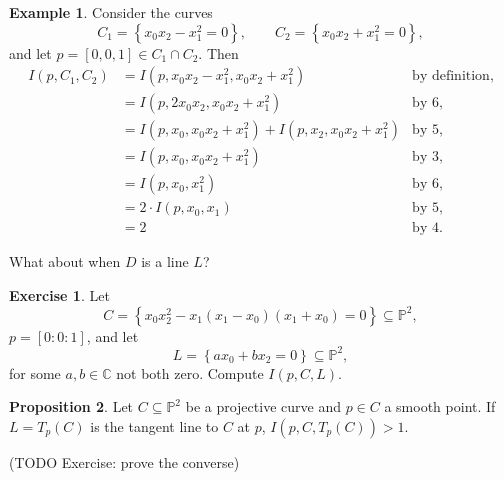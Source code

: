 \documentclass{article}
\newcommand{\C}{\mathbb{C}}
\renewcommand{\P}{\mathbb{P}}
\newcommand{\rb}[1]{\left( #1 \right)}
\renewcommand{\sb}[1]{\left[ #1 \right]}
\newcommand{\cb}[1]{\left\{ #1 \right\}}
\theoremstyle{definition}\newtheorem{definition}{Definition}[section]
\theoremstyle{definition}\newtheorem{notation}[definition]{Notation}
\theoremstyle{definition}\newtheorem{remark}[definition]{Remark}
\theoremstyle{definition}\newtheorem{example}[definition]{Example}
\theoremstyle{definition}\newtheorem{fact}{Fact}
\theoremstyle{definition}\newtheorem{exercise}{Exercise}
\newtheorem{proposition}[definition]{Proposition}
\begin{document}
\begin{example}
Consider the curves
$$ C_1 = \cb{x_0x_2 - x_1^2 = 0}, \qquad C_2 = \cb{x_0x_2 + x_1^2 = 0}, $$
and let $ p = \sb{0, 0, 1} \in C_1 \cap C_2 $. Then
\begin{align*}
I\rb{p, C_1, C_2}
& = I\rb{p, x_0x_2 - x_1^2, x_0x_2 + x_1^2} & \text{by definition}, \\
& = I\rb{p, 2x_0x_2, x_0x_2 + x_1^2} & \text{by } 6, \\
& = I\rb{p, x_0, x_0x_2 + x_1^2} + I\rb{p, x_2, x_0x_2 + x_1^2} & \text{by } 5, \\
& = I\rb{p, x_0, x_0x_2 + x_1^2} & \text{by } 3, \\
& = I\rb{p, x_0, x_1^2} & \text{by } 6, \\
& = 2 \cdot I\rb{p, x_0, x_1} & \text{by } 5, \\
& = 2 & \text{by } 4.
\end{align*}
\end{example}


What about when $ D $ is a line $ L $?

\begin{exercise}
Let
$$ C = \cb{x_0x_2^2 - x_1\rb{x_1 - x_0}\rb{x_1 + x_0} = 0} \subseteq \P^2, $$
$ p = \sb{0 : 0 : 1} $, and let
$$ L = \cb{ax_0 + bx_2 = 0} \subseteq \P^2, $$
for some $ a, b \in \C $ not both zero. Compute $ I\rb{p, C, L} $.
\end{exercise}

\begin{proposition}
Let $ C \subseteq \P^2 $ be a projective curve and $ p \in C $ a smooth point. If $ L = T_p\rb{C} $ is the tangent line to $ C $ at $ p $, $ I\rb{p, C, T_p\rb{C}} > 1 $.
\end{proposition}

(TODO Exercise: prove the converse)
\end{document}

